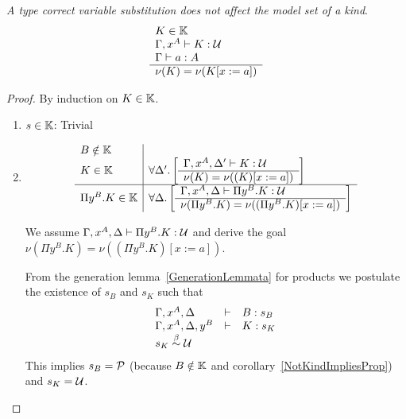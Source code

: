\begin{theorem}
    \label{ModelSubstitutionSame}
    \emph{A type correct variable substitution does not affect the model set of
    a kind}.
    $$
    \begin{array}{l} 
        K \in \mathbb{K}
        \\
        \Gamma,x^A \vdash K: {\cal U}
        \\
        \Gamma \vdash a : A
     \\ \hline 
        \nu(K) = \nu(K[x:=a])
    \end{array}
    $$
    \begin{proof}

        By induction on $K \in \mathbb{K}$.

        \def\goal#1#2{
            \forall #1.
            \left[
                \rulev{
                    \Gamma,x^A,#1 \vdash #2: \Any
                }
                {
                    \nu(#2) = \nu((#2)[x:=a])
                }
            \right]
        }

        \begin{enumerate}
        \item $s \in \mathbb{K}$: Trivial

        \item
            $$
            \begin{array}{l|l}
                B \notin \Kinds
                \\
                K \in \Kinds
                &
                \goal {\Delta'} K
                \\
                \hline
                \Pi y^B. K \in \Kinds
                &
                \goal \Delta {\Pi y^B. K}
            \end{array}
            $$

            We assume $\Gamma,x^A,\Delta \vdash \Pi y^B.K : {\cal U}$ and derive the
            goal $\nu(\Pi y^B. K) = \nu((\Pi y^B.K)[x:=a])$.

            From the generation lemma~\ref{GenerationLemmata} for products we
            postulate the existence of $s_B$ and $s_K$ such that
            $$
            \begin{array}{lll}
                \Gamma,x^A,\Delta &\vdash& B: s_B
                \\
                \Gamma,x^A,\Delta,y^B &\vdash& K : s_K
                \\
                s_K \stackrel{\beta}{\sim} {\cal U}
            \end{array}
            $$
            This implies $s_B = {\cal P}$ (because $B\notin \mathbb{K}$ and
            corollary~\ref{NotKindImpliesProp}) and $s_K = {\cal U}$.


\end{enumerate}
\end{proof}
\end{theorem}
